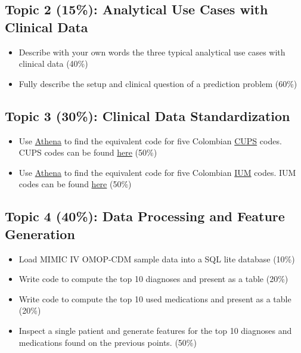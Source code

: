 \documentclass[
]{article}
\providecommand{\tightlist}{%
  \setlength{\itemsep}{0pt}\setlength{\parskip}{0pt}}
\begin{document}
\hypertarget{topic-2-15-analytical-use-cases-with-clinical-data}{%
\subsection{Topic 2 (15\%): Analytical Use Cases with Clinical
Data}\label{topic-2-15-analytical-use-cases-with-clinical-data}}

\begin{itemize}
\tightlist
\item
  Describe with your own words the three typical analytical use cases
  with clinical data (40\%)
\item
  Fully describe the setup and clinical question of a prediction problem
  (60\%)
\end{itemize}

\hypertarget{topic-3-30-clinical-data-standardization}{%
\subsection{Topic 3 (30\%): Clinical Data
Standardization}\label{topic-3-30-clinical-data-standardization}}

\begin{itemize}
\tightlist
\item
  Use \href{athena.ohdsi.org}{Athena} to find the equivalent code for
  five Colombian
  \href{https://www.minsalud.gov.co/sites/rid/Lists/BibliotecaDigital/RIDE/VP/DOA/actualizacion-cups-2022.pdf}{CUPS}
  codes. CUPS codes can be found
  \href{https://web.sispro.gov.co/WebPublico/Consultas/ConsultarDetalleReferenciaBasica.aspx?Code=CUPS}{here}
  (50\%)
\item
  Use \href{athena.ohdsi.org}{Athena} to find the equivalent code for
  five Colombian
  \href{https://www.minsalud.gov.co/salud/MT/Paginas/estandar-datos-medicamentos.aspx}{IUM}
  codes. IUM codes can be found
  \href{https://www.datos.gov.co/Salud-y-Protecci-n-Social/C-DIGO-NICO-DE-MEDICAMENTOS-VIGENTES/i7cb-raxc}{here}
  (50\%)
\end{itemize}

\hypertarget{topic-4-40-data-processing-and-feature-generation}{%
\subsection{Topic 4 (40\%): Data Processing and Feature
Generation}\label{topic-4-40-data-processing-and-feature-generation}}

\begin{itemize}
\tightlist
\item
  Load MIMIC IV OMOP-CDM sample data into a SQL lite database (10\%)
\item
  Write code to compute the top 10 diagnoses and present as a table
  (20\%)
\item
  Write code to compute the top 10 used medications and present as a
  table (20\%)
\item
  Inspect a single patient and generate features for the top 10
  diagnoses and medications found on the previous points. (50\%)
\end{itemize}
\end{document}
